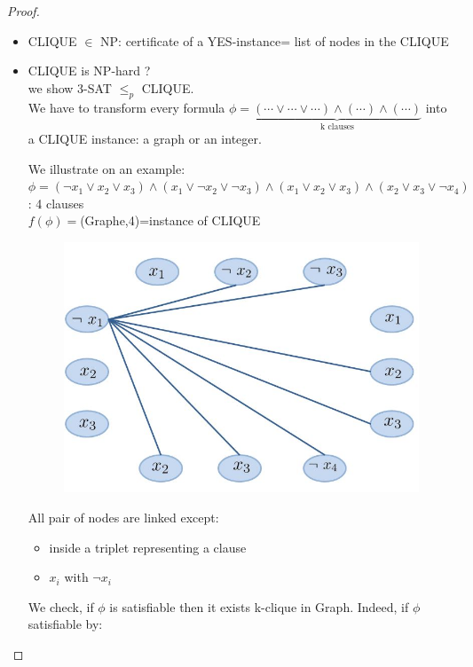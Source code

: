 \documentclass[11pt]{report}
\theoremstyle{definition}
\theoremstyle{remark}
\begin{document}
\begin{proof}
\begin{itemize}
\item CLIQUE $\in$ NP: certificate of a YES-instance= list of nodes in the CLIQUE
\item CLIQUE is NP-hard ? \\
we show 3-SAT $\leq_p$ CLIQUE.  \\
We have to transform every formula $\phi=\underbrace{( \cdots \vee \cdots \vee \cdots) \wedge ( \cdots ) \wedge ( \cdots)}_{\text{k clauses}}$ into a CLIQUE instance: a graph or an integer. 

We illustrate on an example: \\ $\phi=(\neg x_1 \vee x_2 \vee x_3) \wedge (x_1 \vee \neg x_2 \vee \neg x_3) \wedge (x_1 \vee x_2 \vee x_3) \wedge (x_2 \vee x_3 \vee \neg x_4)$: 4 clauses \\ $f(\phi)=$(Graphe,4)=instance of CLIQUE \\ 

\begin{figure}[h!]
\centering
\includegraphics[scale=0.5]{fig_3.jpg}
\end{figure}

All pair of nodes are linked except: 
\begin{itemize}
\item inside a triplet representing a clause
\item $x_i$ with $\neg x_i$
\end{itemize}

We check, if $\phi$ is satisfiable then it exists k-clique in Graph. Indeed, if $\phi$ satisfiable by: \\


\end{itemize}
\end{proof}
\end{document}
